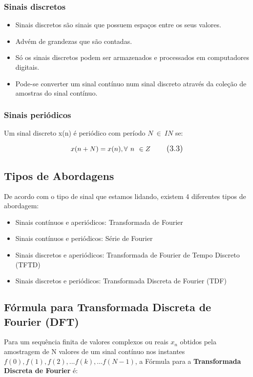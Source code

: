 \subsubsection{Sinais discretos}
\begin{itemize}
\item Sinais discretos são sinais que possuem espaços entre os seus valores.
\item Advém de grandezas que são contadas.
\item Só os sinais discretos podem ser armazenados e processados em computadores digitais.
\item Pode-se converter um sinal contínuo num sinal discreto através da coleção de amostras do sinal contínuo.
\end{itemize}

\subsubsection{Sinais periódicos}
Um sinal discreto x(n) é periódico com período $N \ \in \ IN$ se:

\begin{equation}
\large x(n + N) = x(n), \forall \ n \ \in Z
\tag{3.3}  
\end{equation}

\subsection {Tipos de Abordagens}

De acordo com o tipo de sinal que estamos lidando, existem 4 diferentes tipos de abordagem:
\begin{itemize}
\item Sinais contínuos e aperiódicos: Transformada de Fourier
\item Sinais contínuos e periódicos: Série de Fourier
\item Sinais discretos e aperiódicos: Transformada de Fourier de Tempo Discreto (TFTD)
\item Sinais discretos e periódicos: Transformada Discreta de Fourier (TDF)
\end{itemize}

\subsection {Fórmula para Transformada Discreta de Fourier (DFT)}
Para um sequência finita de valores complexos ou reais $x_{n}$ obtidos pela amostragem de N valores de um sinal contínuo nos instantes $f(0), f(1), f(2), ... f(k), ... f(N-1)$, a Fórmula para a \textbf{Transformada Discreta de Fourier} é: 

